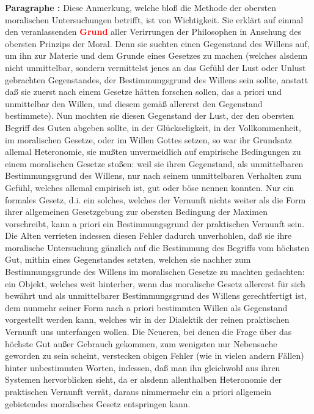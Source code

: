 \documentclass[a4paper,12pt,twoside]{book}
\newcommand{\match}[1]{\textcolor{red}{\textbf{#1}}}
\begin{document}
	\noindent\textbf{Paragraphe : }Diese Anmerkung, welche bloß die Methode der obersten moralischen Untersuchungen betrifft, ist von Wichtigkeit. Sie erklärt auf einmal den veranlassenden \match{Grund} aller Verirrungen der Philosophen in Ansehung des obersten Prinzips der Moral. Denn sie suchten einen Gegenstand des Willens auf, um ihn zur Materie und dem Grunde eines Gesetzes zu machen (welches alsdenn nicht unmittelbar, sondern vermittelst jenes an das Gefühl der Lust oder Unlust gebrachten Gegenstandes, der Bestimmungsgrund des Willens sein sollte, anstatt daß sie zuerst nach einem Gesetze hätten forschen sollen, das a priori und unmittelbar den Willen, und diesem gemäß allererst den Gegenstand bestimmete). Nun mochten sie diesen Gegenstand der Lust, der den obersten Begriff des Guten abgeben sollte, in der Glückseligkeit, in der Vollkommenheit, im moralischen Gesetze, oder im Willen Gottes setzen, so war ihr Grundsatz allemal Heteronomie, sie mußten unvermeidlich auf empirische Bedingungen zu einem moralischen Gesetze stoßen: weil sie ihren Gegenstand, als unmittelbaren Bestimmungsgrund des Willens, nur nach seinem unmittelbaren Verhalten zum Gefühl, welches allemal empirisch ist, gut oder böse nennen konnten. Nur ein formales Gesetz, d.i. ein solches, welches der Vernunft nichts weiter als die Form ihrer allgemeinen Gesetzgebung zur obersten Bedingung der Maximen vorschreibt, kann a priori ein Bestimmungsgrund der praktischen Vernunft sein. Die Alten verrieten indessen diesen Fehler dadurch unverhohlen, daß sie ihre moralische Untersuchung gänzlich auf die Bestimmung des Begriffs vom höchsten Gut, mithin eines Gegenstandes setzten, welchen sie nachher zum Bestimmungsgrunde des Willens im moralischen  Gesetze zu machten gedachten: ein Objekt, welches weit hinterher, wenn das moralische Gesetz allererst für sich bewährt und als unmittelbarer Bestimmungsgrund des Willens gerechtfertigt ist, dem nunmehr seiner Form nach a priori bestimmten Willen als Gegenstand vorgestellt werden kann, welches wir in der Dialektik der reinen praktischen Vernunft uns unterfangen wollen. Die Neueren, bei denen die Frage über das höchste Gut außer Gebrauch gekommen, zum wenigsten nur Nebensache geworden zu sein scheint, verstecken obigen Fehler (wie in vielen andern Fällen) hinter unbestimmten Worten, indessen, daß man ihn gleichwohl aus ihren Systemen hervorblicken sieht, da er alsdenn allenthalben Heteronomie der praktischen Vernunft verrät, daraus nimmermehr ein a priori allgemein gebietendes moralisches Gesetz entspringen kann. 
	
\end{document}
